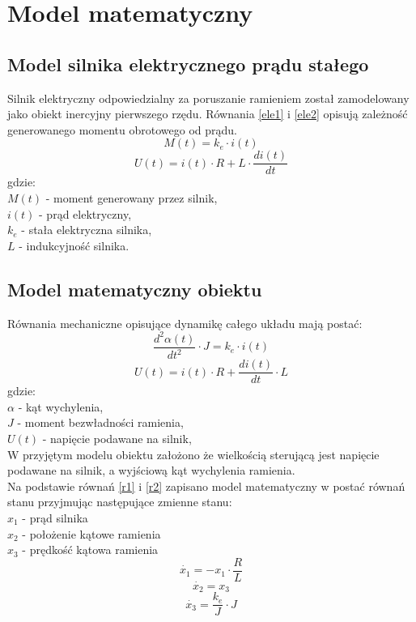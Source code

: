 \chapter{Model matematyczny}

\section{Model silnika elektrycznego prądu stałego}
Silnik elektryczny odpowiedzialny za poruszanie ramieniem został zamodelowany jako obiekt inercyjny pierwszego rzędu. Równania \ref{ele1} i \ref{ele2} opisują zależność generowanego momentu obrotowego od prądu.
\begin{equation}\label{ele1}
M(t) = k_e \cdot i(t)
\end{equation}
\begin{equation}\label{ele2}
U(t) = i(t) \cdot R + L \cdot \frac{di(t)}{dt}
\end{equation}
gdzie:\\
$M(t)$ - moment generowany przez silnik,\\
$i(t)$ - prąd elektryczny,\\
$k_e$ - stała elektryczna silnika,\\
$L$ - indukcyjność silnika.\\
%
\section{Model matematyczny obiektu}
Równania mechaniczne opisujące dynamikę całego układu mają postać:\\
\begin{equation}\label{r1}
\frac{d^2 \alpha(t)}{dt^2} \cdot J = k_e \cdot i(t) 
\end{equation}
\begin{equation}\label{r2}
U(t) = i(t) \cdot R + \frac{d i(t)}{dt} \cdot L
\end{equation}
gdzie:\\
$\alpha$ - kąt wychylenia,\\
$J$ - moment bezwładności ramienia,\\
$U(t)$ - napięcie podawane na silnik,\\

W przyjętym modelu obiektu założono że wielkością sterującą jest napięcie podawane na silnik, a wyjściową kąt wychylenia ramienia.\\
Na podstawie równań \ref{r1} i \ref{r2} zapisano model matematyczny w postać równań stanu przyjmując następujące zmienne stanu:\\
$x_1$ - prąd silnika\\
$x_2$ -  położenie kątowe ramienia\\
$x_3$ - prędkość kątowa ramienia\\
\begin{equation}\label{key}
\dot {x_1} = -x_1  \cdot \frac{R}{L}
\end{equation}
\begin{equation}\label{key}
\dot {x_2} = x_3
\end{equation}
\begin{equation}\label{key}
\dot {x_3} = \frac{k_e}{J} \cdot J
\end{equation}